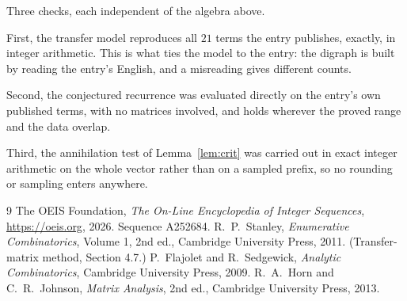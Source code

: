 \documentclass[11pt,a4paper]{article}
\theoremstyle{plain}
\theoremstyle{definition}
\begin{document}
Three checks, each independent of the algebra above.

First, the transfer model reproduces all $21$ terms the entry publishes, exactly, in
integer arithmetic. This is what ties the model to the entry: the digraph is built by reading
the entry's English, and a misreading gives different counts.

Second, the conjectured recurrence was evaluated directly on the entry's own published terms,
with no matrices involved, and holds wherever the proved range and the data overlap.

Third, the annihilation test of Lemma~\ref{lem:crit} was carried out in exact integer
arithmetic on the whole vector rather than on a sampled prefix, so no rounding or sampling
enters anywhere.

\begin{thebibliography}{9}
 The OEIS Foundation, \emph{The On-Line Encyclopedia of Integer
Sequences}, \url{https://oeis.org}, 2026. Sequence A252684.
 R.~P.~Stanley, \emph{Enumerative Combinatorics}, Volume 1, 2nd ed.,
Cambridge University Press, 2011. (Transfer-matrix method, Section 4.7.)
 P.~Flajolet and R.~Sedgewick, \emph{Analytic Combinatorics}, Cambridge
University Press, 2009.
 R.~A.~Horn and C.~R.~Johnson, \emph{Matrix Analysis}, 2nd ed., Cambridge
University Press, 2013.
\end{thebibliography}
\end{document}
